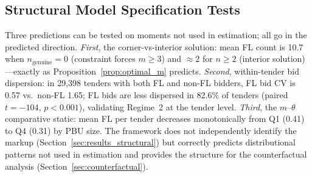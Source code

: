 
\subsection{Structural Model Specification Tests}
\label{sec:spec_tests}

Three predictions can be tested on moments not used in estimation; all go in the predicted direction.
\emph{First}, the corner-vs-interior solution: mean FL count is 10.7
when $n_{\text{genuine}} = 0$ (constraint forces $m \geq 3$) and
$\approx 2$ for $n \geq 2$ (interior solution)---exactly as
Proposition~\ref{prop:optimal_m} predicts.
\emph{Second}, within-tender bid dispersion: in 29,398 tenders with
both FL and non-FL bidders, FL bid CV is 0.57 vs.\ non-FL 1.65; FL
bids are less dispersed in 82.6\% of tenders (paired $t = -104$,
$p < 0.001$), validating Regime~2 at the tender level.
\emph{Third}, the $m$--$\theta$ comparative static: mean FL per tender
decreases monotonically from Q1 (0.41) to Q4 (0.31) by PBU size.
The framework does not independently identify the markup
(Section~\ref{sec:results_structural}) but correctly predicts
distributional patterns not used in estimation and provides the
structure for the counterfactual analysis
(Section~\ref{sec:counterfactual}).
